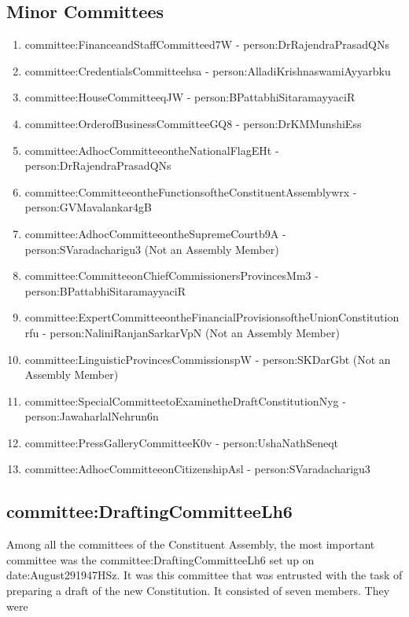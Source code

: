 \subsection{Minor Committees}

\begin{enumerate}
  \item \gls{committee:FinanceandStaffCommitteed7W} - \gls{person:DrRajendraPrasadQNs}
  \item \gls{committee:CredentialsCommitteehsa} - \gls{person:AlladiKrishnaswamiAyyarbku}
  \item \gls{committee:HouseCommitteeqJW} - \gls{person:BPattabhiSitaramayyaciR}
  \item \gls{committee:OrderofBusinessCommitteeGQ8} - \gls{person:DrKMMunshiEss}
  \item \gls{committee:AdhocCommitteeontheNationalFlagEHt} - \gls{person:DrRajendraPrasadQNs}
  \item \gls{committee:CommitteeontheFunctionsoftheConstituentAssemblywrx} - \gls{person:GVMavalankar4gB}
  \item \gls{committee:AdhocCommitteeontheSupremeCourtb9A} - \gls{person:SVaradacharigu3} (Not an Assembly Member)
  \item \gls{committee:CommitteeonChiefCommissionersProvincesMm3} - \gls{person:BPattabhiSitaramayyaciR}
  \item \gls{committee:ExpertCommitteeontheFinancialProvisionsoftheUnionConstitutionrfu} - \gls{person:NaliniRanjanSarkarVpN} (Not an Assembly Member)
  \item \gls{committee:LinguisticProvincesCommissionspW} - \gls{person:SKDarGbt} (Not an Assembly Member)
  \item \gls{committee:SpecialCommitteetoExaminetheDraftConstitutionNyg} - \gls{person:JawaharlalNehrun6n}
  \item \gls{committee:PressGalleryCommitteeK0v} - \gls{person:UshaNathSeneqt}
  \item \gls{committee:AdhocCommitteeonCitizenshipAsl} - \gls{person:SVaradacharigu3}
\end{enumerate}


\subsection{\gls{committee:DraftingCommitteeLh6}}

Among all the committees of the Constituent Assembly, the most important committee was the \gls{committee:DraftingCommitteeLh6} set up on \gls{date:August291947HSz}. It was this committee that was entrusted with the task of preparing a draft of the new Constitution. It consisted of seven members. They were

